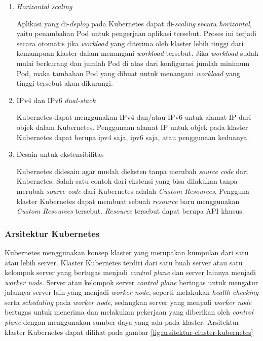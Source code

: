 \begin{enumerate}
    
  \item \emph{Horizontal scaling}

    Aplikasi yang di-\emph{deploy} pada Kubernetes dapat di-\emph{scaling} secara
    \emph{horizontal}, yaitu penambahan Pod untuk pengerjaan aplikasi tersebut. Proses
    ini terjadi secara otomatis jika \emph{workload} yang diterima oleh klaster lebih tinggi
    dari kemampuan klaster dalam menangani \emph{workload} tersebut. Jika \emph{workload}
    sudah mulai berkurang dan jumlah Pod di atas dari konfigurasi jumlah minimum Pod, maka
    tambahan Pod yang dibuat untuk menangani \emph{workload} yang tinggi tersebut akan dikurangi.
    
  \item IPv4 dan IPv6 \emph{dual-stack}

    Kubernetes dapat menggunakan IPv4 dan/atau IPv6 untuk alamat IP dari objek dalam Kubernetes.
    Penggunaan alamat IP untuk objek pada klaster Kubernetes dapat berupa ipv4 saja, ipv6 saja, atau
    penggunaan keduanya.
    
  \item Desain untuk ekstensibilitas

    Kubernetes didesain agar mudah dieksten tanpa merubah \emph{source code} dari Kubernetes.
    Salah satu contoh dari ekstensi yang bisa dilakukan tanpa merubah \emph{source code}
    dari Kubernetes adalah \emph{Custom Resources}. Pengguna klaster Kubernetes dapat
    membuat sebuah \emph{resource} baru menggunakan \emph{Custom Resources} tersebut. \emph{Resource}
    tersebut dapat berupa API khusus.

    \clearpage
    
\end{enumerate}

\subsubsection{Arsitektur Kubernetes}

Kubernetes menggunakan konsep klaster yang merupakan kumpulan dari satu atau
lebih server. Klaster Kubernetes terdiri dari satu buah server atau satu kelompok server yang
bertugas menjadi \emph{control plane} dan server lainnya menjadi \emph{worker node}.
Server atau kelompok server \emph{control plane} bertugas untuk mengatur jalannya
server lain yang menjadi \emph{worker node}, seperti melakukan \emph{health checking} serta
\emph{scheduling} pada \emph{worker node}, sedangkan server yang menjadi \emph{worker node}
bertugas untuk menerima dan melakukan pekerjaan yang diberikan oleh \emph{control plane}
dengan menggunakan sumber daya yang ada pada klaster. Arsitektur
klaster Kubernetes dapat dilihat pada gambar \ref{fig:arsitektur-cluster-kubernetes}

